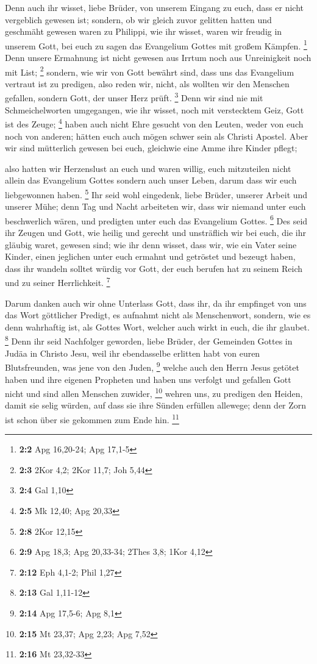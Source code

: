  Denn auch ihr wisset, liebe Brüder, von unserem Eingang zu
euch, dass er nicht vergeblich gewesen ist;  sondern, ob wir
gleich zuvor gelitten hatten und geschmäht gewesen waren zu Philippi,
wie ihr wisset, waren wir freudig in unserem Gott, bei euch zu sagen das
Evangelium Gottes mit großem Kämpfen. \footnote{\textbf{2:2} Apg
  16,20-24; Apg 17,1-5}  Denn unsere Ermahnung ist nicht
gewesen aus Irrtum noch aus Unreinigkeit noch mit List; \footnote{\textbf{2:3}
  2Kor 4,2; 2Kor 11,7; Joh 5,44}  sondern, wie wir von Gott
bewährt sind, dass uns das Evangelium vertraut ist zu predigen, also
reden wir, nicht, als wollten wir den Menschen gefallen, sondern Gott,
der unser Herz prüft. \footnote{\textbf{2:4} Gal 1,10}  Denn
wir sind nie mit Schmeichelworten umgegangen, wie ihr wisset, noch mit
verstecktem Geiz, Gott ist des Zeuge; \footnote{\textbf{2:5} Mk 12,40;
  Apg 20,33}  haben auch nicht Ehre gesucht von den Leuten,
weder von euch noch von anderen;  hätten euch auch mögen
schwer sein als Christi Apostel. Aber wir sind mütterlich gewesen bei
euch, gleichwie eine Amme ihre Kinder pflegt;

 also hatten wir Herzenslust an euch und waren willig, euch
mitzuteilen nicht allein das Evangelium Gottes sondern auch unser Leben,
darum dass wir euch liebgewonnen haben. \footnote{\textbf{2:8} 2Kor
  12,15}  Ihr seid wohl eingedenk, liebe Brüder, unserer
Arbeit und unserer Mühe; denn Tag und Nacht arbeiteten wir, dass wir
niemand unter euch beschwerlich wären, und predigten unter euch das
Evangelium Gottes. \footnote{\textbf{2:9} Apg 18,3; Apg 20,33-34; 2Thes
  3,8; 1Kor 4,12}  Des seid ihr Zeugen und Gott, wie heilig
und gerecht und unsträflich wir bei euch, die ihr gläubig waret, gewesen
sind;  wie ihr denn wisset, dass wir, wie ein Vater seine
Kinder, einen jeglichen unter euch ermahnt und getröstet 
und bezeugt haben, dass ihr wandeln solltet würdig vor Gott, der euch
berufen hat zu seinem Reich und zu seiner Herrlichkeit. \footnote{\textbf{2:12}
  Eph 4,1-2; Phil 1,27}

 Darum danken auch wir ohne Unterlass Gott, dass ihr, da
ihr empfinget von uns das Wort göttlicher Predigt, es aufnahmt nicht als
Menschenwort, sondern, wie es denn wahrhaftig ist, als Gottes Wort,
welcher auch wirkt in euch, die ihr glaubet. \footnote{\textbf{2:13} Gal
  1,11-12}  Denn ihr seid Nachfolger geworden, liebe
Brüder, der Gemeinden Gottes in Judäa in Christo Jesu, weil ihr
ebendasselbe erlitten habt von euren Blutsfreunden, was jene von den
Juden, \footnote{\textbf{2:14} Apg 17,5-6; Apg 8,1}  welche
auch den Herrn Jesus getötet haben und ihre eigenen Propheten und haben
uns verfolgt und gefallen Gott nicht und sind allen Menschen zuwider,
\footnote{\textbf{2:15} Mt 23,37; Apg 2,23; Apg 7,52} 
wehren uns, zu predigen den Heiden, damit sie selig würden, auf dass sie
ihre Sünden erfüllen allewege; denn der Zorn ist schon über sie gekommen
zum Ende hin. \footnote{\textbf{2:16} Mt 23,32-33}

